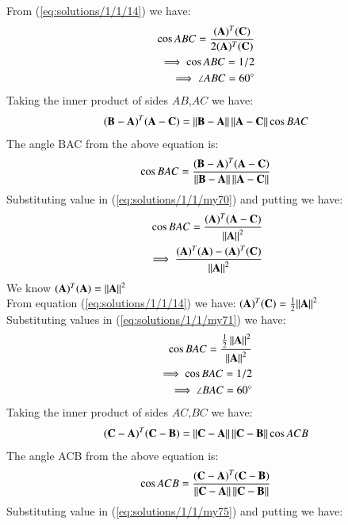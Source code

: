 From (\ref{eq:solutions/1/1/14}) we have:
\begin{align}\label{eq:solutions/1/1/my22}
     \cos{ABC} = \frac{(\mathbf{A})^T(\mathbf{C})}{2(\mathbf{A})^T (\mathbf{C})}\nonumber\\
     \implies \cos{ABC} = 1/2\nonumber\\
\implies \angle {ABC =60 \degree}
\end{align}
Taking the inner product of sides $AB$,$AC$ we have:
\begin{align}
    (\mathbf{B}-\mathbf{A})^T(\mathbf{A}-\mathbf{C}) =
    \left\lVert\mathbf{B}-\mathbf{A}\right\rVert\left\lVert\mathbf{A}-\mathbf{C}\right\rVert\cos{BAC}
\end{align}
The angle BAC from the  above equation is:
\begin{align}\label{eq:solutions/1/1/my70}
     \cos{BAC} = \frac{(\mathbf{B}-\mathbf{A})^T(\mathbf{A}-\mathbf{C})}{\left\lVert\mathbf{B}-\mathbf{A}\right\rVert\left\lVert\mathbf{A}-\mathbf{C}\right\rVert} 
\end{align}
Substituting value in (\ref{eq:solutions/1/1/my70}) and putting we have:
\begin{align}\label{eq:solutions/1/1/my71}
     \cos{BAC} = \frac{(\mathbf{A})^T(\mathbf{A-C})}{\left\lVert\mathbf{A}\right\rVert^2}\\
     \implies \frac{(\mathbf{A})^T(\mathbf{A})-(\mathbf{A})^T(\mathbf{C})}{\left\lVert\mathbf{A}\right\rVert^2}
\end{align}
We know $(\mathbf{A})^T (\mathbf{A})= {\left\lVert\mathbf{A}\right\rVert^2}$\\
From  equation (\ref{eq:solutions/1/1/14}) we have:
$ (\mathbf{A})^T(\mathbf{C})= \frac{1}{2}{\left\lVert\mathbf{A}\right\rVert^2}$\\
Substituting values in (\ref{eq:solutions/1/1/my71}) we have:
\begin{align}\label{eq:solutions/1/1/my72}
\cos{BAC} =
    \frac{{\frac{1}{2}\left\lVert\mathbf{A}\right\rVert^2}}{\left\lVert\mathbf{A}\right\rVert^2}\nonumber\\
     \implies \cos{BAC} = 1/2\nonumber\\
\implies \angle {BAC =60 \degree}
\end{align}
Taking the inner product of sides $AC$,$BC$ we have:
\begin{align}
    (\mathbf{C}-\mathbf{A})^T(\mathbf{C}-\mathbf{B}) =
    \left\lVert\mathbf{C}-\mathbf{A}\right\rVert\left\lVert\mathbf{C}-\mathbf{B}\right\rVert\cos{ACB}
\end{align}
The angle ACB from the  above equation is:
\begin{align}
\label{eq:solutions/1/1/my75}
     \cos{ACB} = \frac{(\mathbf{C}-\mathbf{A})^T(\mathbf{C}-\mathbf{B})}{\left\lVert\mathbf{C}-\mathbf{A}\right\rVert\left\lVert\mathbf{C}-\mathbf{B}\right\rVert} 
\end{align}
Substituting value in (\ref{eq:solutions/1/1/my75}) and putting we have:
